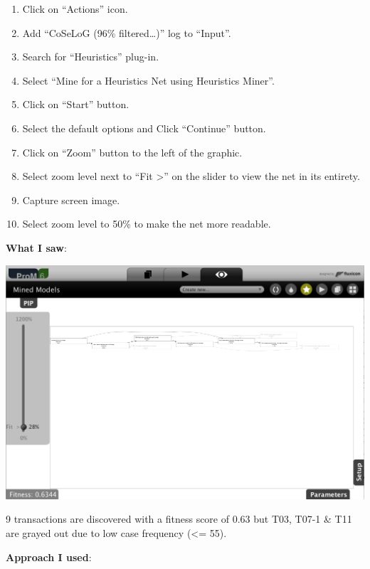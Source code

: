\documentclass[]{article}
\begin{document}
\begin{enumerate}
\def\labelenumi{\arabic{enumi}.}
\setcounter{enumi}{26}
\itemsep1pt\parskip0pt
\item
  Click on ``Actions'' icon.\\
\item
  Add ``CoSeLoG (96\% filtered\ldots{})'' log to ``Input''.\\
\item
  Search for ``Heuristics'' plug-in.\\
\item
  Select ``Mine for a Heuristics Net using Heuristics Miner''.
\item
  Click on ``Start'' button.
\item
  Select the default options and Click ``Continue'' button.
\item
  Click on ``Zoom'' button to the left of the graphic.\\
\item
  Select zoom level next to ``Fit \textgreater{}'' on the slider to view
  the net in its entirety.
\item
  Capture screen image.\\
\item
  Select zoom level to 50\% to make the net more readable.
\end{enumerate}

\textbf{What I saw}:

\includegraphics{CoSeLoG_Step_05_Filter96_Heuristics_Net.png}

9 transactions are discovered with a fitness score of 0.63 but T03,
T07-1 \& T11 are grayed out due to low case frequency (\textless{}= 55).

\textbf{Approach I used}:
\end{document}
